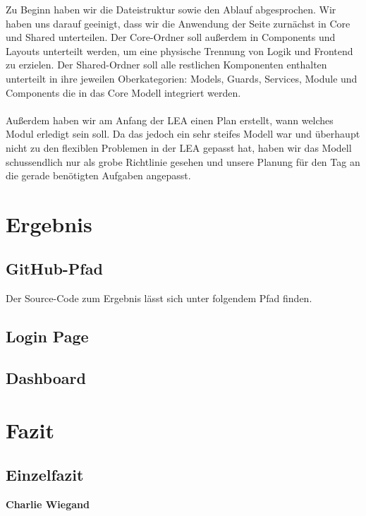 \documentclass[12pt,titlepage]{article}
\begin{document}
Zu Beginn haben wir die Dateistruktur sowie den Ablauf abgesprochen. Wir haben uns darauf geeinigt, dass wir die Anwendung der Seite zurnächst in Core und Shared unterteilen. Der Core-Ordner soll außerdem in Components und Layouts unterteilt werden, um eine physische Trennung von Logik und Frontend zu erzielen. Der Shared-Ordner soll alle restlichen Komponenten enthalten unterteilt in ihre jeweilen Oberkategorien: Models, Guards, Services, Module und Components die in das Core Modell integriert werden. \\ \\

Außerdem haben wir am Anfang der LEA einen Plan erstellt, wann welches Modul erledigt sein soll. Da das jedoch ein sehr steifes Modell war und überhaupt nicht zu den flexiblen Problemen in der LEA gepasst hat, haben wir das Modell schussendlich nur als grobe Richtlinie gesehen und unsere Planung für den Tag an die gerade benötigten Aufgaben angepasst.


\section{Ergebnis}

\subsection{GitHub-Pfad}

Der Source-Code zum Ergebnis lässt sich unter folgendem Pfad finden.

\subsection{Login Page}



\subsection{Dashboard}


\section{Fazit}

\subsection{Einzelfazit}
\textbf{Charlie Wiegand}
\end{document}
